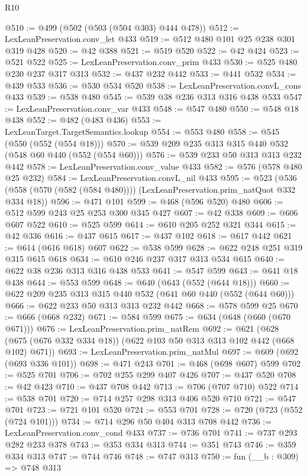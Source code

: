 \begin{lexlean}{R10}
\begin{coremodule}
@510 := @499 (@502 (@503 (@504 @303) @444 @478))
@512 := LexLeanPreservation.conv_let @433
@519 := @512 @480 @101 @25 @238 @301 @319 @428
@520 := @42 @388
@521 := @519 @520
@522 := @42 @424
@523 := @521 @522
@525 := LexLeanPreservation.conv_prim @433
@530 := @525 @480 @230 @237 @317 @313
@532 := @437 @232 @442
@533 := @441 @532
@534 := @439 @533
@536 := @530 @534 @520
@538 := LexLeanPreservation.convL_cons @433
@539 := @538 @480
@545 := @539 @38 @236 @313 @316 @438 @533
@547 := LexLeanPreservation.conv_var @433
@548 := @547 @480
@550 := @548 @18 @438
@552 := @482 (@483 @436)
@553 := LexLeanTarget.TargetSemantics.lookup
@554 := @553 @480
@558 := @545 (@550 (@552 (@554 @18)))
@570 := @539 @209 @235 @313 @315 @440 @532 (@548 @60 @440 (@552 (@554 @60)))
@576 := @539 @233 @50 @313 @313 @232 @442
@578 := LexLeanPreservation.conv_value @433
@582 := @576 (@578 @480 @25 @232)
@584 := LexLeanPreservation.convL_nil @433
@595 := @523
    (@536 (@558 (@570 (@582 (@584 @480)))) (LexLeanPreservation.prim_natQuot @332 @334 @18))
@596 := @471 @101
@599 := @468 (@596 @520) @480
@606 := @512 @599 @243 @25 @253 @300 @345 @427
@607 := @42 @338
@609 := @606 @607 @522
@610 := @525 @599
@614 := @610 @205 @252 @321 @344
@615 := @42 @336
@616 := @437 @615
@617 := @437 @102
@618 := @617 @442
@621 := @614 (@616 @618) @607
@622 := @538 @599
@628 := @622 @248 @251 @319 @315 @615 @618
@634 := @610 @246 @237 @317 @313 @534 @615
@640 := @622 @38 @236 @313 @316 @438 @533
@641 := @547 @599
@643 := @641 @18 @438
@644 := @553 @599
@648 := @640 (@643 (@552 (@644 @18)))
@660 := @622 @209 @235 @313 @315 @440 @532 (@641 @60 @440 (@552 (@644 @60)))
@666 := @622 @233 @50 @313 @313 @232 @442
@668 := @578 @599 @25
@670 := @666 (@668 @232)
@671 := @584 @599
@675 := @634 (@648 (@660 (@670 @671)))
@676 := LexLeanPreservation.prim_natRem
@692 := @621 (@628 (@675 (@676 @332 @334 @18)) (@622 @103 @50 @313 @313 @102 @442 (@668 @102) @671))
@693 := LexLeanPreservation.prim_natMul
@697 := @609 (@692 (@693 @336 @101))
@698 := @471 @243
@701 := @468 (@698 @607) @599
@702 := @525 @701
@706 := @702 @255 @299 @407 @426
@707 := @437 @520
@708 := @42 @423
@710 := @437 @708 @442
@713 := @706 (@707 @710) @522
@714 := @538 @701
@720 := @714 @257 @298 @313 @406 @520 @710
@721 := @547 @701
@723 := @721 @101 @520
@724 := @553 @701
@728 := @720 (@723 (@552 (@724 @101)))
@734 := @714 @296 @50 @404 @313 @708 @442
@736 := LexLeanPreservation.conv_cond @433
@737 := @736 @701
@741 := @737 @293 @282 @233 @378
@743 := @353 @334 @313
@744 := @351 @743
@746 := @359 @334 @313
@747 := @744 @746
@748 := @747 @313
@750 := fun (__b : @309) => @748 @313

\end{coremodule}
\end{lexlean}
